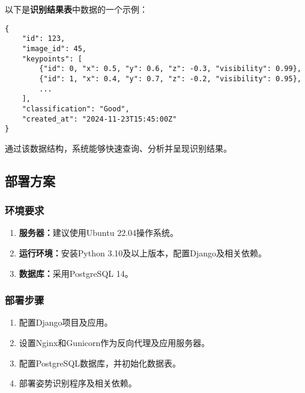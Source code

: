 \noindent
以下是\textbf{识别结果表}中数据的一个示例：

\begin{lstlisting}[caption=识别结果表数据示例, label=listing:result_table_sample]
{
    "id": 123,
    "image_id": 45,
    "keypoints": [
        {"id": 0, "x": 0.5, "y": 0.6, "z": -0.3, "visibility": 0.99},
        {"id": 1, "x": 0.4, "y": 0.7, "z": -0.2, "visibility": 0.95},
        ...
    ],
    "classification": "Good",
    "created_at": "2024-11-23T15:45:00Z"
}
\end{lstlisting}

\noindent
通过该数据结构，系统能够快速查询、分析并呈现识别结果。


\subsection{部署方案}

\subsubsection{环境要求}

\begin{enumerate}
    \item \textbf{服务器：}建议使用Ubuntu 22.04操作系统。
    \item \textbf{运行环境：}安装Python 3.10及以上版本，配置Django及相关依赖。
    \item \textbf{数据库：}采用PostgreSQL 14。
\end{enumerate}

\subsubsection{部署步骤}

\begin{enumerate}
    \item 配置Django项目及应用。
    \item 设置Nginx和Gunicorn作为反向代理及应用服务器。
    \item 配置PostgreSQL数据库，并初始化数据表。
    \item 部署姿势识别程序及相关依赖。
\end{enumerate}
